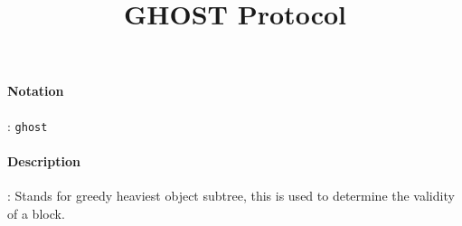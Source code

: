 \documentclass[10pt,a4paper,oneside]{scrartcl}
\author{}
\title{GHOST Protocol}
\date{}
\begin{document}
\maketitle
\paragraph{Notation}: \texttt{ghost}
\paragraph{Description}: Stands for greedy heaviest object subtree, this is used to determine the validity of a block. 
\end{document}
